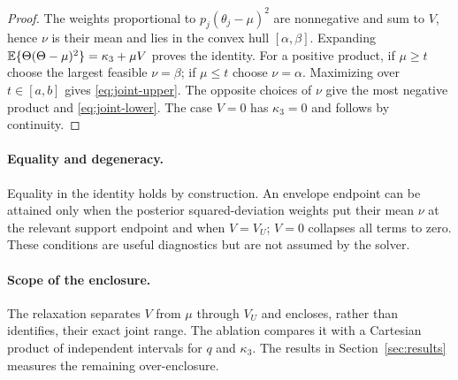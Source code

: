 \begin{proof}
The weights proportional to
$p_j(\theta_j-\mu)^2$ are nonnegative and sum to $V$, hence $\nu$ is their
mean and lies in the convex hull $[\alpha,\beta]$.  Expanding
$\mathbb E\{\Theta(\Theta-\mu)^2\}= \kappa_3+\mu V$ proves the identity.
For a positive product, if $\mu\ge t$ choose the largest feasible
$\nu=\beta$; if $\mu\le t$ choose $\nu=\alpha$.  Maximizing over
$t\in[a,b]$ gives \eqref{eq:joint-upper}.  The opposite choices of $\nu$
give the most negative product and \eqref{eq:joint-lower}.  The case $V=0$
has $\kappa_3=0$ and follows by continuity.
\end{proof}

\paragraph{Equality and degeneracy.}
Equality in the identity holds by construction.  An envelope endpoint can be
attained only when the posterior squared-deviation weights put their mean
$\nu$ at the relevant support endpoint and when $V=V_U$; $V=0$ collapses all
terms to zero.  These conditions are useful diagnostics but are not assumed
by the solver.

\paragraph{Scope of the enclosure.}
The relaxation separates $V$ from $\mu$ through $V_U$ and encloses, rather than
identifies, their exact joint range.  The ablation compares it with a Cartesian product of independent intervals
for $q$ and $\kappa_3$. The results in
Section~\ref{sec:results} measures the remaining over-enclosure.

